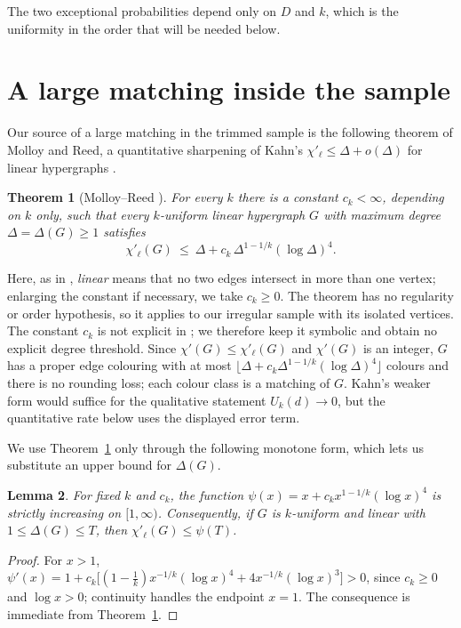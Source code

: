 \documentclass[10pt,a4paper]{amsart}
\newtheorem{theorem}{Theorem}[section]
\newtheorem{lemma}[theorem]{Lemma}
\newcommand{\chil}{\chi'_{\ell}}
\newcommand{\Deltaop}{\Delta}
\begin{document}
The two exceptional probabilities depend only on $D$ and $k$, which is the uniformity in
the order that will be needed below.

\section{A large matching inside the sample}
\label{sec:colour}

Our source of a large matching in the trimmed sample is the following theorem of Molloy and
Reed, a quantitative sharpening of Kahn's $\chil\le\Delta+o(\Delta)$ for linear hypergraphs
\cite{Kahn96}.

\begin{theorem}[Molloy--Reed {\cite[Theorem 1]{MolloyReed}}]
\label{thm:MR}
For every $k$ there is a constant $c_k<\infty$, depending on $k$ only, such that every
$k$-uniform linear hypergraph $G$ with maximum degree $\Delta=\Deltaop(G)\ge1$ satisfies
\[
  \chil(G)\ \le\ \Delta+c_k\,\Delta^{1-1/k}(\log\Delta)^4 .
\]
\end{theorem}

Here, as in \cite[\S1]{MolloyReed}, \emph{linear} means that no two edges intersect in more
than one vertex; enlarging the constant if necessary, we take $c_k\ge0$. The theorem has
no regularity or order hypothesis, so it applies to our irregular sample with its isolated
vertices. The constant $c_k$ is not explicit in \cite{MolloyReed}; we therefore keep it
symbolic and obtain no explicit degree threshold. Since $\chi'(G)\le\chil(G)$ and $\chi'(G)$ is an integer, $G$ has a proper edge colouring
with at most $\lfloor\Delta+c_k\Delta^{1-1/k}(\log\Delta)^4\rfloor$ colours and there is no
rounding loss; each colour class is a matching of $G$. Kahn's weaker form would suffice for
the qualitative statement $U_k(d)\to0$, but the quantitative rate below uses the displayed
error term.

We use Theorem~\ref{thm:MR} only through the following monotone form, which lets us
substitute an upper bound for $\Delta(G)$.

\begin{lemma}
\label{lem:MRmono}
For fixed $k$ and $c_k$, the function $\psi(x)=x+c_k x^{1-1/k}(\log x)^4$ is strictly
increasing on $[1,\infty)$. Consequently, if $G$ is $k$-uniform and linear with
$1\le\Deltaop(G)\le T$, then $\chil(G)\le\psi(T)$.
\end{lemma}

\begin{proof}
For $x>1$,
$\psi'(x)=1+c_k\bigl[(1-\tfrac1k)x^{-1/k}(\log x)^4+4x^{-1/k}(\log x)^3\bigr]>0$,
since $c_k\ge0$ and $\log x>0$; continuity handles the endpoint $x=1$. The consequence
is immediate from Theorem~\ref{thm:MR}.
\end{proof}
\end{document}

